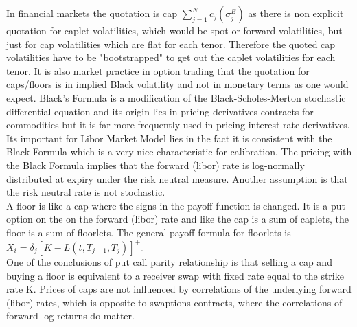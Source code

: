 \documentclass[11pt]{article}
\numberwithin{equation}{subsection}
\begin{document}
In financial markets the quotation is cap \(\sum_{j=1}^{N} c_{j}(\sigma_{j}^{B})\) as there is non explicit quotation for caplet volatilities, which would be spot or forward volatilities, but just for cap volatilities which are flat for each tenor. Therefore the quoted cap volatilities have to be "bootstrapped" to get out the caplet volatilities for each tenor. It is also market practice in option trading that the quotation for caps/floors is in implied Black volatility and not in monetary terms as one would expect.
Black's Formula is a modification of the Black-Scholes-Merton stochastic differential equation and its origin lies in pricing derivatives contracts for commodities but it is far more frequently used in pricing interest rate derivatives. Its important for Libor Market Model lies in the fact it is consistent with the Black Formula which is a very nice characteristic for calibration. The pricing with the Black Formula implies that the forward (libor) rate is log-normally distributed at expiry under the risk neutral measure. Another assumption is that the risk neutral rate is not stochastic.\\
A floor is like a cap where the signs in the payoff function is changed. It is a put option on the on the forward (libor) rate and like the cap is a sum of caplets, the floor is a sum of floorlets. The general payoff formula for floorlets is \(X_i=\delta_{j}[K - L(t, T_{j-1}, T_{j})]^{+}\).\\
One of the conclusions of put call parity relationship is that selling a cap and buying a floor is equivalent to a receiver swap with fixed rate equal to the strike rate K. Prices of caps are not influenced by correlations of the underlying forward (libor) rates, which is opposite to swaptions contracts, where the correlations of forward log-returns do matter.
\end{document}
